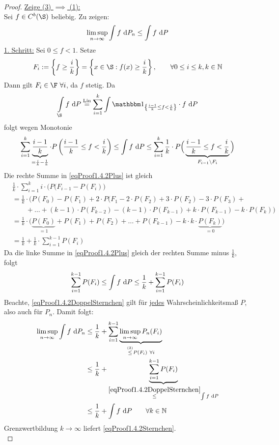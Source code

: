 \begin{proof}
\underline{Zeige (3) $\implies$ (1):}\\
Sei $f\in C^b(\S)$ beliebig. Zu zeigen:
\begin{align}\label{eqProof1.4.2Sternchen}
\limsup\limits_{n\to\infty}\int\limits f\text{ d} P_n\leq\int\limits f\text{ d} P
\end{align}
\underline{1. Schritt:} Sei $0\leq f<1$. Setze
\begin{align*}
F_i:=\left\lbrace f\geq\frac{i}{k}\right\rbrace=\left\lbrace x\in\S:f(x)\geq\frac{i}{k}\right\rbrace,\qquad \forall 0\leq i\leq k,k\in\N
\end{align*}
Dann gilt $F_i\in\F~\forall i$, da $f$ stetig. Da 
\begin{align*}
\int\limits_{\S}f\d P
\stackeq{\text{Lin}}
\sum\limits_{i=1}^k\int\limits\indi_{\left\lbrace\frac{i-1}{k}\leq f<\frac{i}{k}\right\rbrace}\cdot f\d P
\end{align*}
folgt wegen Monotonie
\begin{align}\label{eqProof1.4.2Plus}
\sum\limits_{i=1}^k\underbrace{\frac{i-1}{k}}_{=\frac{i}{k}-\frac{1}{k}}\cdot P\left(\frac{i-1}{k}\leq f<\frac{i}{k}\right)
\leq
\int\limits f\text{ d} P
\leq
\sum\limits_{i=1}^k \frac{1}{k}\cdot P\Big(\underbrace{\frac{i-1}{k}\leq f<\frac{i}{k}}_{F_{i-1}\setminus F_i}\Big)
\end{align}
Die rechte Summe in \eqref{eqProof1.4.2Plus} ist gleich
\begin{align*}
&\frac{1}{k}\cdot\sum\limits_{i=1}^k i\cdot\big( P(F_{i-1}-P(F_i)\big)\\
&=\frac{1}{k}\cdot\Big(P(F_0)-P(F_1)+2\cdot P(F_1-2\cdot P(F_2)+3\cdot P(F_2)-3\cdot P(F_3)+\\
&\qquad+\ldots+(k-1)\cdot P(F_{k-2})-(k-1)\cdot P(F_{k-1})+k\cdot P(F_{k-1})-k\cdot P(F_k)\Big)\\
&=\frac{1}{k}\cdot\Big(\underbrace{P(F_0)}_{=1}+P(F_1)+P(F_2)+\ldots+P(F_{k-1})-k\cdot k\cdot \underbrace{P(F_k)}_{=0}\Big)\\
&=\frac{1}{k}+\frac{1}{k}\cdot\sum\limits_{i=1}^{k-1} P(F_i)
\end{align*}
Da die linke Summe in \eqref{eqProof1.4.2Plus} gleich der rechten Summe minus $\frac{1}{k}$, folgt
\begin{align}\label{eqProof1.4.2DoppelSternchen}
\sum\limits_{i=1}^{k-1} P(F_i)
\leq\int\limits f\text{ d} P
\leq\frac{1}{k}+\sum\limits_{i=1}^{k-1} P(F_i)
\end{align}
Beachte, \eqref{eqProof1.4.2DoppelSternchen} gilt für \ul{jedes} Wahrscheinlichkeitsmaß $P$, also auch für $P_n$. Damit folgt:
\begin{align*}
\limsup\limits_{n\to\infty}\int\limits f\text{ d} P_n
&\leq\frac{1}{k}+\sum\limits_{i=1}^{k-1}\underbrace{\limsup\limits_{n\to\infty} P_n(F_i)}_{\stackrel{(3)}{\leq}P(F_i)~\forall i}\\
&\leq\frac{1}{k}+\underbrace{\sum\limits_{i=1}^{k-1} P(F_i)}_{\stackrel{\eqref{eqProof1.4.2DoppelSternchen}}{\leq}\int\limits f\text{ d} P}\\
&\leq\frac{1}{k}+\int\limits f\text{ d} P\qquad\forall k\in\mathbb{N}
\end{align*}
Grenzwertbildung $k\to\infty$ liefert \eqref{eqProof1.4.2Sternchen}.\\


\end{proof}
